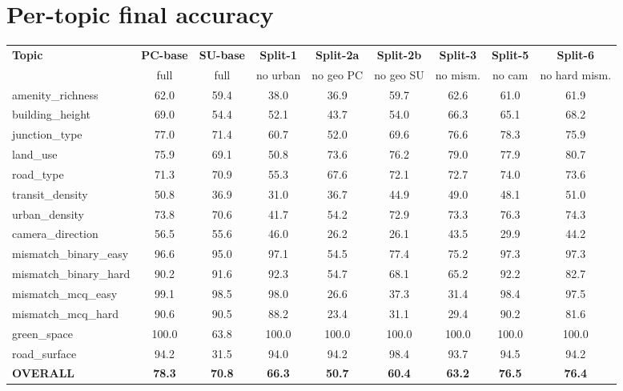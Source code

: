 \documentclass[11pt]{article}
\newcommand{\wh}[1]{\cellcolor{withheldbg}#1}
\begin{document}
\newpage
\section{Per-topic final accuracy}

\begin{table}[h]\centering\footnotesize
\setlength{\tabcolsep}{3.5pt}
\renewcommand{\arraystretch}{1.05}
\begin{tabular}{l c c c c c c c c}
\toprule
\textbf{Topic} & \textbf{PC-base} & \textbf{SU-base} & \textbf{Split-1} & \textbf{Split-2a} & \textbf{Split-2b} & \textbf{Split-3} & \textbf{Split-5} & \textbf{Split-6} \\
                & full      & full      & no urban     & no geo PC    & no geo SU    & no mism.   & no cam     & no hard mism. \\
\midrule
amenity\_richness     & 62.0  & 59.4 & \wh{38.0} & 36.9      & 59.7      & 62.6      & 61.0      & 61.9 \\
building\_height      & 69.0  & 54.4 & \wh{52.1} & 43.7      & 54.0      & 66.3      & 65.1      & 68.2 \\
junction\_type        & 77.0  & 71.4 & \wh{60.7} & 52.0      & 69.6      & 76.6      & 78.3      & 75.9 \\
land\_use             & 75.9  & 69.1 & \wh{50.8} & 73.6      & 76.2      & 79.0      & 77.9      & 80.7 \\
road\_type            & 71.3  & 70.9 & \wh{55.3} & 67.6      & 72.1      & 72.7      & 74.0      & 73.6 \\
transit\_density      & 50.8  & 36.9 & \wh{31.0} & 36.7      & 44.9      & 49.0      & 48.1      & 51.0 \\
urban\_density        & 73.8  & 70.6 & \wh{41.7} & 54.2      & 72.9      & 73.3      & 76.3      & 74.3 \\
\midrule
camera\_direction     & 56.5  & 55.6 & 46.0      & \wh{26.2} & \wh{26.1} & 43.5      & \wh{29.9} & 44.2 \\
mismatch\_binary\_easy& 96.6  & 95.0 & 97.1      & \wh{54.5} & \wh{77.4} & \wh{75.2} & 97.3      & 97.3 \\
mismatch\_binary\_hard& 90.2  & 91.6 & 92.3      & \wh{54.7} & \wh{68.1} & \wh{65.2} & 92.2      & \wh{82.7} \\
mismatch\_mcq\_easy   & 99.1  & 98.5 & 98.0      & \wh{26.6} & \wh{37.3} & \wh{31.4} & 98.4      & 97.5 \\
mismatch\_mcq\_hard   & 90.6  & 90.5 & 88.2      & \wh{23.4} & \wh{31.1} & \wh{29.4} & 90.2      & \wh{81.6} \\
\midrule
green\_space          & 100.0 & 63.8 & 100.0     & 100.0     & 100.0     & 100.0     & 100.0     & 100.0 \\
road\_surface         & 94.2  & 31.5 & 94.0      & 94.2      & 98.4      & 93.7      & 94.5      & 94.2 \\
\midrule
\textbf{OVERALL}      & \textbf{78.3} & \textbf{70.8} & \textbf{66.3} & \textbf{50.7} & \textbf{60.4} & \textbf{63.2} & \textbf{76.5} & \textbf{76.4} \\
\bottomrule
\end{tabular}
\end{table}
\end{document}
